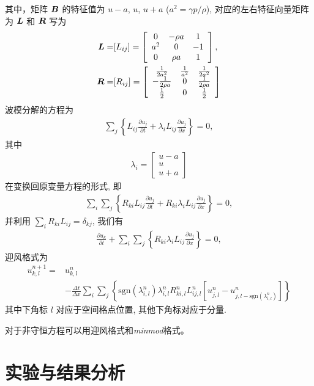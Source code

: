 \documentclass[10.5pt
]{article}
\begin{document}
其中，矩阵 $\vb*B$ 的特征值为 $u-a$, $u$, $u+a$ ($a^2 = \gamma p/\rho$), 对应的左右特征向量矩阵为 $\vb*L$ 和 $\vb*R$ 写为
\begin{align}
\vb*L =& [L_{ij}] = \left[\begin{array}{ccc}0 & -\rho a & 1\\ a^2 & 0 & -1\\ 0 & \rho a & 1\end{array}\right],
\\
\vb*R =& [R_{ij}] = \left[\begin{array}{ccc}\frac{1}{2a^2} & \frac{1}{a^2} & \frac{1}{2a^2}\\
-\frac{1}{2\rho a} & 0 & \frac{1}{2\rho a}\\ \frac{1}{2} & 0 & \frac{1}{2}\end{array}\right]
\end{align}
波模分解的方程为
\begin{align}
\sum_j \left\{L_{ij} \frac{\partial u_j}{\partial t} + \lambda_i L_{ij} \frac{\partial u_j}{\partial
x}\right\} = 0,
\end{align}
其中
\begin{align}
\lambda_i =
\left[\begin{array}{c}u-a \\ u\\ u+a\end{array}\right]
\end{align}
在变换回原变量方程的形式, 即
\begin{align}
\sum_i \sum_j \left\{R_{ki} L_{ij} \frac{\partial u_j}{\partial t} + R_{ki} \lambda_i L_{ij}
\frac{\partial u_j}{\partial x}\right\} = 0,
\end{align}
并利用 $\sum_i R_{ki} L_{ij} = \delta_{kj}$, 我们有
\begin{align}
\frac{\partial u_k}{\partial t} + \sum_i \sum_j \left\{R_{ki} \lambda_i L_{ij} \frac{\partial
u_j}{\partial x}\right\} = 0,
\end{align}
迎风格式为
\begin{align}
u_{k,l}^{n+1} =& u_{k,l}^n \nonumber\\
& - \frac{\Delta t}{\Delta x} \sum_i \sum_j \left\{\text{sgn}(\lambda_{i,l}^n)
 \lambda_{i,l}^n R_{ki,l}^n L_{ij,l}^n \left[u_{j,l}^n - u_{j,l-\text{sgn}(\lambda_{i,l}^n)}^n\right]\right\}
\end{align}
其中下角标 $l$ 对应于空间格点位置, 其他下角标对应于分量.

对于非守恒方程可以用迎风格式和\textit{minmod}格式。

\section{实验与结果分析}
\end{document}
